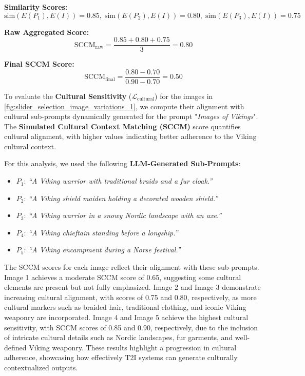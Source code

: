 \noindent \textbf{Similarity Scores:}
\[
\text{sim}(E(P_1), E(I)) = 0.85, \; \text{sim}(E(P_2), E(I)) = 0.80, \; \text{sim}(E(P_3), E(I)) = 0.75
\]

\noindent \textbf{Raw Aggregated Score:}
\[
\text{SCCM}_{\text{raw}} = \frac{0.85 + 0.80 + 0.75}{3} = 0.80
\]

\noindent \textbf{Final SCCM Score:}
\[
\text{SCCM}_{\text{final}} = \frac{0.80 - 0.70}{0.90 - 0.70} = 0.50
\]


To evaluate the \textbf{Cultural Sensitivity} (\(\mathcal{L}_{\text{cultural}}\)) for the images in \cref{fig:slider_selection_image_variations_1}, we compute their alignment with cultural sub-prompts dynamically generated for the prompt "\emph{Images of Vikings}". The \textbf{Simulated Cultural Context Matching (SCCM)} score quantifies cultural alignment, with higher values indicating better adherence to the Viking cultural context. 

For this analysis, we used the following \textbf{LLM-Generated Sub-Prompts}:
\begin{itemize}
    \item \(P_1\): \emph{“A Viking warrior with traditional braids and a fur cloak.”}
    \item \(P_2\): \emph{“A Viking shield maiden holding a decorated wooden shield.”}
    \item \(P_3\): \emph{“A Viking warrior in a snowy Nordic landscape with an axe.”}
    \item \(P_4\): \emph{“A Viking chieftain standing before a longship.”}
    \item \(P_5\): \emph{“A Viking encampment during a Norse festival.”}
\end{itemize}

The SCCM scores for each image reflect their alignment with these sub-prompts. Image 1 achieves a moderate SCCM score of 0.65, suggesting some cultural elements are present but not fully emphasized. Image 2 and Image 3 demonstrate increasing cultural alignment, with scores of 0.75 and 0.80, respectively, as more cultural markers such as braided hair, traditional clothing, and iconic Viking weaponry are incorporated. Image 4 and Image 5 achieve the highest cultural sensitivity, with SCCM scores of 0.85 and 0.90, respectively, due to the inclusion of intricate cultural details such as Nordic landscapes, fur garments, and well-defined Viking weaponry. These results highlight a progression in cultural adherence, showcasing how effectively T2I systems can generate culturally contextualized outputs.









